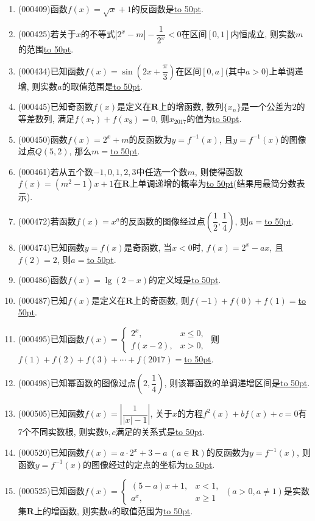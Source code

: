\documentclass[10pt,a4paper]{article}
\newcommand{\blank}[1]{\underline{\hbox to #1pt{}}}
\begin{document}
\begin{enumerate}[1.]
\item {\tiny (000409)}函数$f(x)=\sqrt x+1$的反函数是\blank{50}.
\item {\tiny (000425)}若关于$x$的不等式$|2^x-m|-\dfrac1{2^x}<0$在区间$[0,1]$内恒成立, 则实数$m$的范围\blank{50}.
\item {\tiny (000434)}已知函数$f(x)=\sin (2x+\dfrac\pi 3)$在区间$[0,a]$(其中$a>0$)上单调递增, 则实数$a$的取值范围是\blank{50}.
\item {\tiny (000445)}已知奇函数$f(x)$是定义在$\mathbf{R}$上的增函数, 数列$\{x_n\}$是一个公差为$2$的等差数列, 满足$f(x_7)+f(x_8)=0$, 则$x_{2017}$的值为\blank{50}.
\item {\tiny (000450)}函数$f(x)=2^x+m$的反函数为$y=f^{-1}(x)$, 且$y=f^{-1}(x)$的图像过点$Q(5,2)$, 那么$m=$\blank{50}.
\item {\tiny (000461)}若从五个数$-1,0,1,2,3$中任选一个数$m$, 则使得函数$f(x)=(m^2-1)x+1$在$\mathbf{R}$上单调递增的概率为\blank{50}(结果用最简分数表示).
\item {\tiny (000472)}若函数$f(x)=x^a$的反函数的图像经过点$(\dfrac12,\dfrac14)$, 则$a=$\blank{50}.
\item {\tiny (000474)}已知函数$y=f(x)$是奇函数, 当$x<0$时, $f(x)=2^x-ax$, 且$f(2)=2$, 则$a=$\blank{50}.
\item {\tiny (000486)}函数$f(x)=\lg(2-x)$的定义域是\blank{50}.
\item {\tiny (000487)}已知$f(x)$是定义在$\mathbf{R}$上的奇函数, 则$f(-1)+f(0)+f(1)=$\blank{50}.
\item {\tiny (000495)}已知函数$f(x)=\begin{cases} 2^x, & x\le 0, \\ f(x-2), & x>0, \end{cases}$ 则$f(1)+f(2)+f(3)+\cdots+f(2017)=$\blank{50}.
\item {\tiny (000498)}已知幂函数的图像过点$(2,\dfrac14)$, 则该幂函数的单调递增区间是\blank{50}.
\item {\tiny (000505)}已知函数$f(x)=\left|\dfrac1{|x|-1}\right|$, 关于$x$的方程$f^2(x)+bf(x)+c=0$有$7$个不同实数根, 则实数$b,c$满足的关系式是\blank{50}.
\item {\tiny (000520)}已知函数$f(x)=a\cdot 2^x+3-a\ (a\in \mathbf{R})$的反函数为$y=f^{-1}(x)$, 则函数$y=f^{-1}(x)$的图像经过的定点的坐标为\blank{50}.
\item {\tiny (000525)}已知函数$f(x)=\begin{cases} (5-a)x+1, & x<1, \\ a^x, & x\ge 1\end{cases} \ (a>0,a\ne 1)$是实数集$\mathbf{R}$上的增函数, 则实数$a$的取值范围为\blank{50}.

\end{enumerate}
\end{document}
